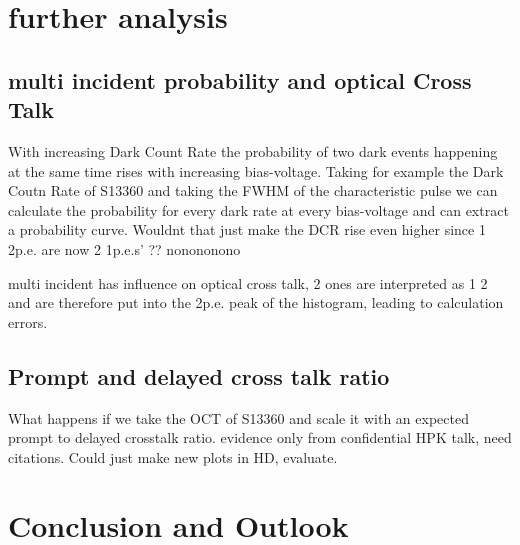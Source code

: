 \documentclass[12pt,article,type=msc,colorback,accentcolor=tud9c]{tudthesis}
\begin{document}
{%
\clearpage
\section{\Large further analysis}
\subsection{multi incident probability and optical Cross Talk}

With increasing Dark Count Rate the probability of two dark events happening at the same time rises with increasing bias-voltage. Taking for example the Dark Coutn Rate of S13360 and taking the FWHM of the characteristic pulse we can calculate the probability for every dark rate at every bias-voltage and can extract a probability curve. 
Wouldnt that just make the DCR rise even higher since 1 2p.e. are now 2 1p.e.s' ??
nonononono


multi incident has influence on optical cross talk, 2 ones are interpreted as 1 2 and are therefore put into the 2p.e. peak of the histogram, leading to calculation errors.



\subsection{Prompt and delayed cross talk ratio}
What happens if we take the OCT of S13360 and scale it with an expected prompt to delayed crosstalk ratio. evidence only from confidential HPK talk, need citations. Could just make new plots in HD, evaluate.



\section{\Large Conclusion and Outlook}



}
\end{document}

